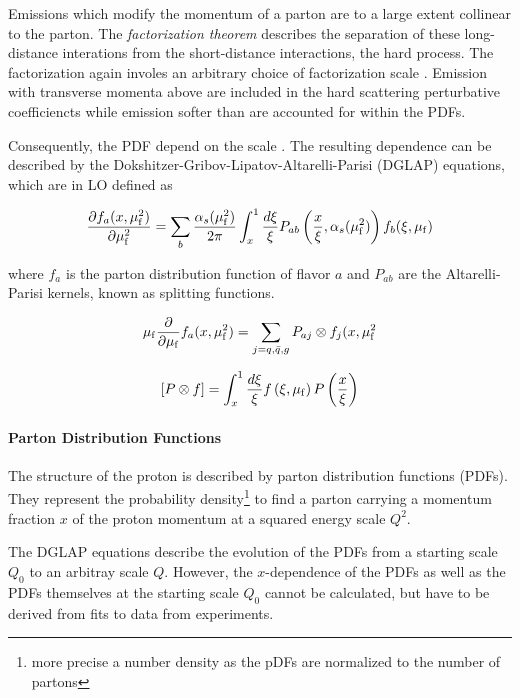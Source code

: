 Emissions which modify the momentum of a parton are to a large extent collinear
to the parton. The \emph{factorization theorem} describes the separation of
these long-distance interations from the short-distance interactions, the hard
process. The factorization again involes an arbitrary choice of factorization
scale \muf. Emission with transverse momenta above \muf are included in the hard
scattering perturbative coefficiencts while emission softer than \muf are
accounted for within the PDFs.

Consequently, the PDF depend on the scale \muf. The resulting dependence can be
described by the Dokshitzer-Gribov-Lipatov-Altarelli-Parisi (DGLAP) equations,
which are in LO defined as

\begin{equation*}
    \frac{\partial f_a (x, \mu_{\mathrm{f}}^2)}{\partial \mu_{\mathrm{f}}^2} = \sum_b \frac{\alpha_{s}(\mu_{\mathrm{f}}^2)}{2 \pi} \int_x^1
    \frac{d \xi}{\xi} P_{ab} \left(\frac{x}{\xi},
    \alpha_{s}(\mu_{\mathrm{f}}^2)\right) f_b(\xi, \mu_{\mathrm{f}})
\end{equation*}

where $f_a$ is the parton distribution function of flavor $a$ and $P_{ab}$ are
the Altarelli-Parisi kernels, known as splitting functions. 

\begin{equation*}
    \mu_{\mathrm{f}} \frac{\partial}{\partial \mu_{\mathrm{f}}} f_a(x, \mu_{\mathrm{f}}^2)  = \sum_{j=q,\bar q, g}
    P_{aj} \otimes f_j(x, \mu_{\mathrm{f}}^2
\end{equation*}

\begin{equation*}
    \left[ P \otimes f \right] = \int_{x}^1 \frac{d \xi}{\xi} f\left(\xi,
    \mu_{\mathrm{f}} \right) P\left(\frac{x}{\xi}\right)
\end{equation*}

\paragraph{Parton Distribution Functions}

The structure of the proton is described by parton distribution functions
(PDFs).  They represent the probability density\footnote{more precise a number
density as the pDFs are normalized to the number of partons} to find a parton
carrying a momentum fraction $x$ of the proton momentum at a squared energy
scale $Q^2$. 

The DGLAP equations describe the evolution of the PDFs from a starting scale
$Q_0$ to an arbitray scale $Q$. However, the $x$-dependence of the PDFs as well
as the PDFs themselves at the starting scale $Q_0$ cannot be calculated, but
have to be derived from fits to data from experiments.

